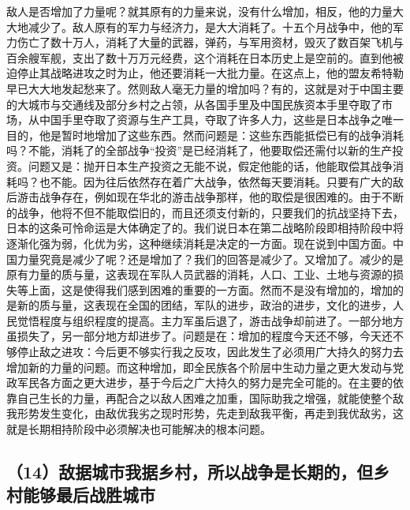 敌人是否增加了力量呢？就其原有的力量来说，没有什么增加，相反，他的力量大大地减少了。敌人原有的军力与经济力，是大大消耗了。十五个月战争中，他的军力伤亡了数十万人，消耗了大量的武器，弹药，与军用资材，毁灭了数百架飞机与百余艘军舰，支出了数十万万元经费，这个消耗在日本历史上是空前的。直到他被迫停止其战略进攻之时为止，他还要消耗一大批力量。在这点上，他的盟友希特勒早已大大地发起愁来了。然则敌人毫无力量的增加吗？有的，这就是对于中国主要的大城市与交通线及部分乡村之占领，从各国手里及中国民族资本手里夺取了市场，从中国手里夺取了资源与生产工具，夺取了许多人力，这些是日本战争之唯一目的，他是暂时地增加了这些东西。然而问题是：这些东西能抵偿已有的战争消耗吗？不能，消耗了的全部战争“投资”是已经消耗了，他要取偿还需付以新的生产投资。问题又是：抛开日本生产投资之无能不说，假定他能的话，他能取偿其战争消耗吗？也不能。因为往后依然存在着广大战争，依然每天要消耗。只要有广大的敌后游击战争存在，例如现在华北的游击战争那样，他的取偿是很困难的。由于不断的战争，他将不但不能取偿旧的，而且还须支付新的，只要我们的抗战坚持下去，日本的这条可怜命运是大体确定了的。我们说日本在第二战略阶段即相持阶段中将逐渐化强为弱，化优为劣，这种继续消耗是决定的一方面。现在说到中国方面。中国力量究竟是减少了呢？还是增加了？我们的回答是减少了。又增加了。减少的是原有力量的质与量，这表现在军队人员武器的消耗，人口、工业、土地与资源的损失等上面，这是使得我们感到困难的重要的一方面。然而不是没有增加的，增加的是新的质与量，这表现在全国的团结，军队的进步，政治的进步，文化的进步，人民觉悟程度与组织程度的提高。主力军虽后退了，游击战争却前进了。一部分地方虽损失了，另一部分地方却进步了。问题是在：增加的程度今天还不够，今天还不够停止敌之进攻：今后更不够实行我之反攻，因此发生了必须用广大持久的努力去增加新的力量的问题。而这种增加，即全民族各个阶层中生动力量之更大发动与党政军民各方面之更大进步，基于今后之广大持久的努力是完全可能的。在主要的依靠自己生长的力量，再配合之以敌人困难之加重，国际助我之增强，就能使整个敌我形势发生变化，由敌优我劣之现时形势，先走到敌我平衡，再走到我优敌劣，这就是长期相持阶段中必须解决也可能解决的根本问题。

\subsection{（14）敌据城市我据乡村，所以战争是长期的，但乡村能够最后战胜城市}


